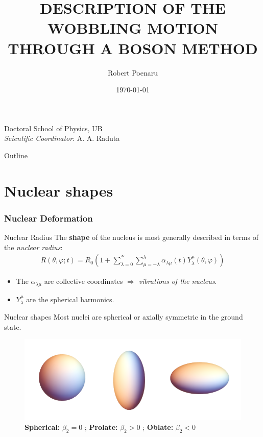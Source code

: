 \documentclass{beamer}
\title[Wobbling Motion]{DESCRIPTION OF THE WOBBLING MOTION THROUGH A BOSON METHOD}
\author{Robert Poenaru}
\institute{DFT, IFIN-HH}
\date{\today}
\begin{document}
\begin{frame}
  \titlepage
  \vspace{1em} Doctoral School of Physics, UB\\
  \vspace{1em}\emph{Scientific Coordinator}: A. A. Raduta
\end{frame}

\begin{frame}{Outline}
\tableofcontents
\end{frame}

\section{Nuclear shapes}

\begin{frame}
  \frametitle{Nuclear Deformation}

  \begin{exampleblock}{Nuclear Radius}
    The \textbf{shape} of the nucleus is most generally described in terms of the \emph{nuclear radius}:
    \begin{align}
      R(\theta,\varphi;t)=R_0\left(1+\sum_{\lambda=0}^{^\infty}\sum_{\mu=-\lambda}^\lambda\alpha_{\lambda\mu}(t)Y_\lambda^\mu(\theta,\varphi)\right)
    \end{align}
  \end{exampleblock}
\begin{itemize}
  \item The $\alpha_{\lambda\mu}$ are collective coordinates $\Longrightarrow$ \emph{vibrations of the nucleus}.
  \item $Y_\lambda^\mu$ are the spherical harmonics.
\end{itemize}
\end{frame}


\begin{frame}{Nuclear shapes}
  Most nuclei are spherical or axially symmetric in the ground state.
    \begin{figure}
      \centering
      \includegraphics[scale=0.4]{figures/nuclear_shapes.png}
      \caption{\textbf{Spherical:} $\beta_2=0$ ; \textbf{Prolate:} $\beta_2>0$ ; \textbf{Oblate:} $\beta_2<0$}
    \end{figure}
  \end{frame}
\end{document}
